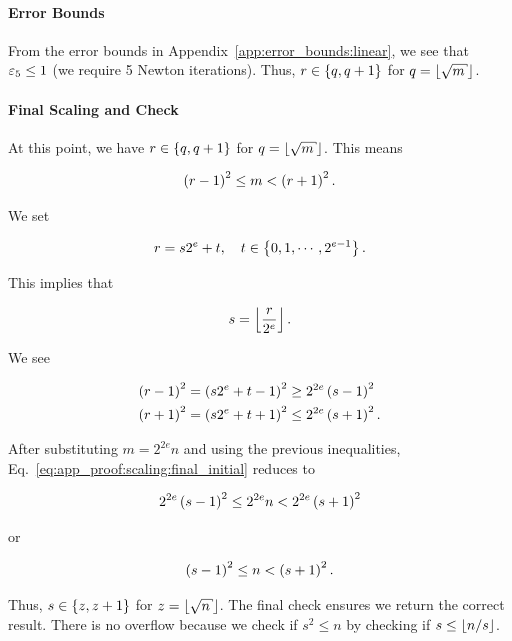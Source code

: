 \paragraph{Error Bounds}
From the error bounds in Appendix~\ref{app:error_bounds:linear},
we see that $\varepsilon_{5}\le1$ (we require 5 Newton iterations).
Thus, $r\in\left\{ q,q+1 \right\}$ for $q = \floor{\sqrt{m}}$.

\paragraph{Final Scaling and Check}
At this point, we have $r\in\left\{ q,q+1 \right\}$ for $q=\floor{\sqrt{m}}$.
This means

\begin{equation}
    \left( r-1 \right)^{2} \le m < \left( r+1 \right)^{2}.
    \label{eq:app_proof:scaling:final_initial}
\end{equation}

We set

\begin{equation}
    r = s2^{e} + t, \quad t\in\left\{ 0,1,\cdots,2^{e-1} \right\}.
\end{equation}

\noindent
This implies that

\begin{equation}
    s = \left\lfloor \frac{r}{2^{e}} \right\rfloor.
\end{equation}

\noindent
We see

\begin{align}
    \left( r-1 \right)^{2} &= \left( s2^{e} + t - 1 \right)^{2} \ge 2^{2e}\left( s-1 \right)^{2}
        \nonumber\\
    \left( r+1 \right)^{2} &= \left( s2^{e} + t + 1 \right)^{2} \le 2^{2e}\left( s+1 \right)^{2}.
\end{align}

\noindent
After substituting $m=2^{2e}n$ and using the previous inequalities,
Eq.~\eqref{eq:app_proof:scaling:final_initial} reduces to

\begin{equation}
    2^{2e}\left( s-1 \right)^{2} \le 2^{2e}n < 2^{2e}\left( s+1 \right)^{2}
\end{equation}

\noindent
or

\begin{equation}
    \left( s-1 \right)^{2} \le n < \left( s+1 \right)^{2}.
\end{equation}

\noindent
Thus, $s\in\left\{ z, z+1 \right\}$ for $z=\floor{\sqrt{n}}$.
The final check ensures we return the correct result.
There is no overflow because we check if $s^{2} \le n$
by checking if $s \le \left\lfloor n/s \right\rfloor$.

